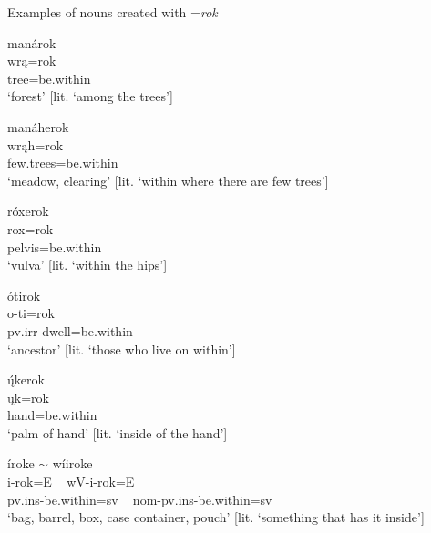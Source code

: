 \begin{exe}

\item\label{ExamplesOfNominalRok} Examples of nouns created with =\textit{rok}

\begin{xlist}
 
\item\label{ExamplesOfNominalRok1} \glll manárok\\
    wrą=rok\\
    \textnormal{tree}=\textnormal{be.within}\\
    \glt `forest' [lit. `among the trees']

\item\label{ExamplesOfNominalRok2} \glll manáherok\\
    wrąh=rok\\
    \textnormal{few.trees}=\textnormal{be.within}\\
    \glt `meadow, clearing' [lit. `within where there are few trees']

\item\label{ExamplesOfNominalRok3} \glll róxerok\\
    rox=rok\\
    \textnormal{pelvis}=\textnormal{be.within}\\
    \glt `vulva' [lit. `within the hips']
    
\item\label{ExamplesOfNominalRok4} \glll ótirok\\
    o-ti=rok\\
    pv.irr-\textnormal{dwell}=\textnormal{be.within}\\
    \glt `ancestor' [lit. `those who live on within']

\item\label{ExamplesOfNominalRok5} \glll ų́kerok\\
    ųk=rok\\
    \textnormal{hand}=\textnormal{be.within}\\
    \glt `palm of hand' [lit. `inside of the hand']

\item\label{ExamplesOfNominalRok6} \glll íroke $\sim$ wíiroke\\
    i-rok=E ~ wV-i-rok=E\\
    pv.ins-\textnormal{be.within}=sv ~ nom-pv.ins-\textnormal{be.within}=sv\\
    \glt `bag, barrel, box, case container, pouch' [lit. `something that has it inside']


\end{xlist}
\end{exe}
